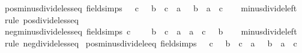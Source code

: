 \begin{isabellebody}
\isanewline
{}\isamarkupfalse%
\ pos{\isacharunderscore}{\kern0pt}minus{\isacharunderscore}{\kern0pt}divide{\isacharunderscore}{\kern0pt}less{\isacharunderscore}{\kern0pt}eq\ {\isacharbrackleft}{\kern0pt}field{\isacharunderscore}{\kern0pt}simps{\isacharbrackright}{\kern0pt}{\isacharcolon}{\kern0pt}\ {\isachardoublequoteopen}{}\ {\isacharless}{\kern0pt}\ c\ {\isasymLongrightarrow}\ {\isacharminus}{\kern0pt}\ {\isacharparenleft}{\kern0pt}b\ {\isacharslash}{\kern0pt}\ c{\isacharparenright}{\kern0pt}\ {\isacharless}{\kern0pt}\ a\ {\isasymlongleftrightarrow}\ {\isacharminus}{\kern0pt}\ b\ {\isacharless}{\kern0pt}\ a\ {\isacharasterisk}{\kern0pt}\ c{\isachardoublequoteclose}\isanewline
%
\isadelimproof
\ \ %
\endisadelimproof
%
\isatagproof
{}\isamarkupfalse%
\ minus{\isacharunderscore}{\kern0pt}divide{\isacharunderscore}{\kern0pt}left\ \isamarkupfalse%
\ {\isacharparenleft}{\kern0pt}rule\ pos{\isacharunderscore}{\kern0pt}divide{\isacharunderscore}{\kern0pt}less{\isacharunderscore}{\kern0pt}eq{\isacharparenright}{\kern0pt}%
\endisatagproof
{\isafoldproof}%
%
\isadelimproof
\isanewline
%
\endisadelimproof
\isanewline
{}\isamarkupfalse%
\ neg{\isacharunderscore}{\kern0pt}minus{\isacharunderscore}{\kern0pt}divide{\isacharunderscore}{\kern0pt}less{\isacharunderscore}{\kern0pt}eq\ {\isacharbrackleft}{\kern0pt}field{\isacharunderscore}{\kern0pt}simps{\isacharbrackright}{\kern0pt}{\isacharcolon}{\kern0pt}\ {\isachardoublequoteopen}c\ {\isacharless}{\kern0pt}\ {}\ {\isasymLongrightarrow}\ {\isacharminus}{\kern0pt}\ {\isacharparenleft}{\kern0pt}b\ {\isacharslash}{\kern0pt}\ c{\isacharparenright}{\kern0pt}\ {\isacharless}{\kern0pt}\ a\ {\isasymlongleftrightarrow}\ a\ {\isacharasterisk}{\kern0pt}\ c\ {\isacharless}{\kern0pt}\ {\isacharminus}{\kern0pt}\ b{\isachardoublequoteclose}\isanewline
%
\isadelimproof
\ \ %
\endisadelimproof
%
\isatagproof
{}\isamarkupfalse%
\ minus{\isacharunderscore}{\kern0pt}divide{\isacharunderscore}{\kern0pt}left\ \isamarkupfalse%
\ {\isacharparenleft}{\kern0pt}rule\ neg{\isacharunderscore}{\kern0pt}divide{\isacharunderscore}{\kern0pt}less{\isacharunderscore}{\kern0pt}eq{\isacharparenright}{\kern0pt}%
\endisatagproof
{\isafoldproof}%
%
\isadelimproof
\isanewline
%
\endisadelimproof
\isanewline
{}\isamarkupfalse%
\ pos{\isacharunderscore}{\kern0pt}minus{\isacharunderscore}{\kern0pt}divide{\isacharunderscore}{\kern0pt}le{\isacharunderscore}{\kern0pt}eq\ {\isacharbrackleft}{\kern0pt}field{\isacharunderscore}{\kern0pt}simps{\isacharbrackright}{\kern0pt}{\isacharcolon}{\kern0pt}\ {\isachardoublequoteopen}{}\ {\isacharless}{\kern0pt}\ c\ {\isasymLongrightarrow}\ {\isacharminus}{\kern0pt}\ {\isacharparenleft}{\kern0pt}b\ {\isacharslash}{\kern0pt}\ c{\isacharparenright}{\kern0pt}\ {\isasymle}\ a\ {\isasymlongleftrightarrow}\ {\isacharminus}{\kern0pt}\ b\ {\isasymle}\ a\ {\isacharasterisk}{\kern0pt}\ c{\isachardoublequoteclose}\isanewline

\end{isabellebody}
